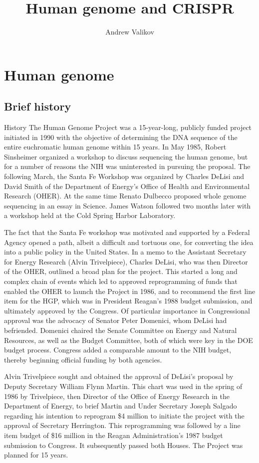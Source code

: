 \documentclass[12pt]{article}
\begin{document}
\title{Human genome and CRISPR}
\author{Andrew Valikov}
\date{}
\maketitle

\section{Human genome}

\subsection{Brief history}

History
The Human Genome Project was a 15-year-long, publicly funded project initiated in 1990 with the objective of determining the DNA sequence of the entire euchromatic human genome within 15 years. In May 1985, Robert Sinsheimer organized a workshop to discuss sequencing the human genome, but for a number of reasons the NIH was uninterested in pursuing the proposal. The following March, the Santa Fe Workshop was organized by Charles DeLisi and David Smith of the Department of Energy's Office of Health and Environmental Research (OHER). At the same time Renato Dulbecco proposed whole genome sequencing in an essay in Science. James Watson followed two months later with a workshop held at the Cold Spring Harbor Laboratory.

The fact that the Santa Fe workshop was motivated and supported by a Federal Agency opened a path, albeit a difficult and tortuous one, for converting the idea into a public policy in the United States. In a memo to the Assistant Secretary for Energy Research (Alvin Trivelpiece), Charles DeLisi, who was then Director of the OHER, outlined a broad plan for the project. This started a long and complex chain of events which led to approved reprogramming of funds that enabled the OHER to launch the Project in 1986, and to recommend the first line item for the HGP, which was in President Reagan's 1988 budget submission, and ultimately approved by the Congress. Of particular importance in Congressional approval was the advocacy of Senator Peter Domenici, whom DeLisi had befriended. Domenici chaired the Senate Committee on Energy and Natural Resources, as well as the Budget Committee, both of which were key in the DOE budget process. Congress added a comparable amount to the NIH budget, thereby beginning official funding by both agencies.

Alvin Trivelpiece sought and obtained the approval of DeLisi's proposal by Deputy Secretary William Flynn Martin. This chart was used in the spring of 1986 by Trivelpiece, then Director of the Office of Energy Research in the Department of Energy, to brief Martin and Under Secretary Joseph Salgado regarding his intention to reprogram \$4 million to initiate the project with the approval of Secretary Herrington. This reprogramming was followed by a line item budget of \$16 million in the Reagan Administration’s 1987 budget submission to Congress. It subsequently passed both Houses. The Project was planned for 15 years.
\end{document}
